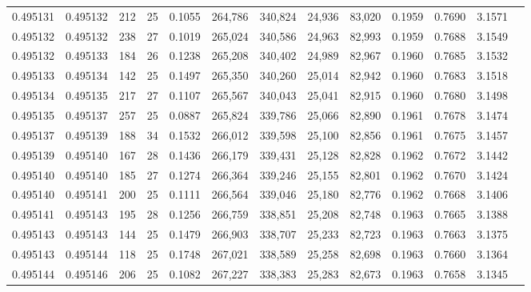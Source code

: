\begin{tabular}{rrrrrrrrrrrrr}
0.495131 & 0.495132 & 212 &  25 &                                     0.1055 & 264,786 & 340,824 &  24,936 &  83,020 & 0.1959 & 0.7690 & 3.1571 \\
0.495132 & 0.495132 & 238 &  27 &                                     0.1019 & 265,024 & 340,586 &  24,963 &  82,993 & 0.1959 & 0.7688 & 3.1549 \\
0.495132 & 0.495133 & 184 &  26 &                                     0.1238 & 265,208 & 340,402 &  24,989 &  82,967 & 0.1960 & 0.7685 & 3.1532 \\
0.495133 & 0.495134 & 142 &  25 &                                     0.1497 & 265,350 & 340,260 &  25,014 &  82,942 & 0.1960 & 0.7683 & 3.1518 \\
0.495134 & 0.495135 & 217 &  27 &                                     0.1107 & 265,567 & 340,043 &  25,041 &  82,915 & 0.1960 & 0.7680 & 3.1498 \\
0.495135 & 0.495137 & 257 &  25 &                                     0.0887 & 265,824 & 339,786 &  25,066 &  82,890 & 0.1961 & 0.7678 & 3.1474 \\
0.495137 & 0.495139 & 188 &  34 &                                     0.1532 & 266,012 & 339,598 &  25,100 &  82,856 & 0.1961 & 0.7675 & 3.1457 \\
0.495139 & 0.495140 & 167 &  28 &                                     0.1436 & 266,179 & 339,431 &  25,128 &  82,828 & 0.1962 & 0.7672 & 3.1442 \\
0.495140 & 0.495140 & 185 &  27 &                                     0.1274 & 266,364 & 339,246 &  25,155 &  82,801 & 0.1962 & 0.7670 & 3.1424 \\
0.495140 & 0.495141 & 200 &  25 &                                     0.1111 & 266,564 & 339,046 &  25,180 &  82,776 & 0.1962 & 0.7668 & 3.1406 \\
0.495141 & 0.495143 & 195 &  28 &                                     0.1256 & 266,759 & 338,851 &  25,208 &  82,748 & 0.1963 & 0.7665 & 3.1388 \\
0.495143 & 0.495143 & 144 &  25 &                                     0.1479 & 266,903 & 338,707 &  25,233 &  82,723 & 0.1963 & 0.7663 & 3.1375 \\
0.495143 & 0.495144 & 118 &  25 &                                     0.1748 & 267,021 & 338,589 &  25,258 &  82,698 & 0.1963 & 0.7660 & 3.1364 \\
0.495144 & 0.495146 & 206 &  25 &                                     0.1082 & 267,227 & 338,383 &  25,283 &  82,673 & 0.1963 & 0.7658 & 3.1345 \\

\end{tabular}
